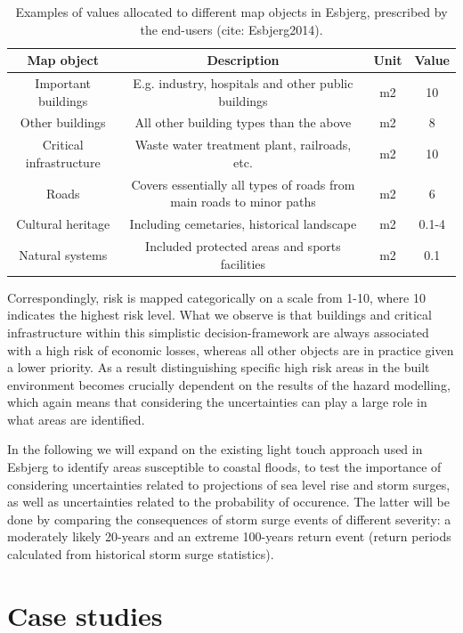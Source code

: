 \documentclass[draft,linenumbers]{agujournal}
\begin{document}
\begin{table}
\begin{center}
\begin{tabular}[]{c | c | c | c }

Map object&Description&Unit&Value\\
\hline
Important buildings&E.g. industry, hospitals and other public buildings&m2&10\\
Other buildings&All other building types than the above&m2&8\\
Critical infrastructure&Waste water treatment plant, railroads, etc.&m2&10\\
Roads&Covers essentially all types of roads from main roads to minor paths&m2&6\\
Cultural heritage&Including cemetaries, historical landscape&m2&0.1-4\\
Natural systems&Included protected areas and sports facilities&m2&0.1\\
\hline
\end{tabular}
\end{center}
\caption{Examples of values allocated to different map objects in Esbjerg, prescribed by the end-users {\color{blue}(cite: Esbjerg2014)}.}
\label{tab:valuemap}
\end{table} 

Correspondingly, risk is mapped categorically on a scale from 1-10, where 10 indicates the highest risk level. What we observe is that buildings and critical infrastructure within this simplistic decision-framework are always associated with a high risk of economic losses, whereas all other objects are in practice given a lower priority. As a result distinguishing specific high risk areas in the built environment becomes crucially dependent on the results of the hazard modelling, which again means that considering the uncertainties can play a large role in what areas are identified.

In the following we will expand on the existing light touch approach used in Esbjerg to identify areas susceptible to coastal floods, to test the importance of considering uncertainties related to projections of sea level rise and storm surges, as well as uncertainties related to the probability of occurence. The latter will be done by comparing the consequences of storm surge events of different severity: a moderately likely 20-years and an extreme 100-years return event (return periods calculated from historical storm surge statistics). 

\section{Case studies}
\label{cases}
\end{document}

